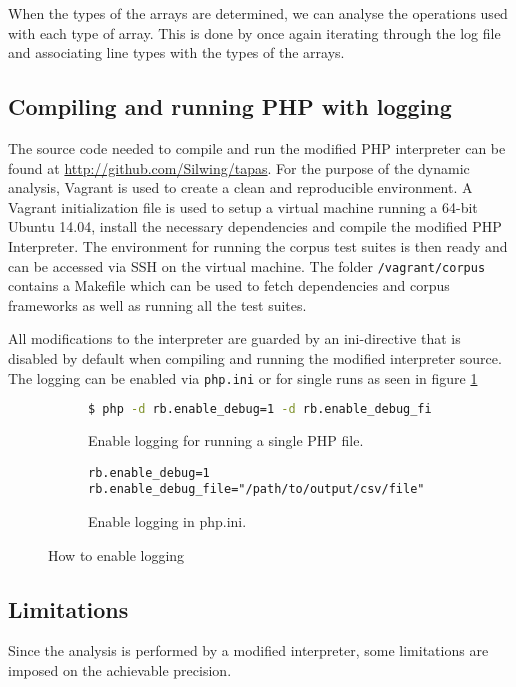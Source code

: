 When the types of the arrays are determined, we can analyse the operations used with each type of array. This is done by once again iterating through the log file and associating line types with the types of the arrays.

\subsection{Compiling and running PHP with logging}
The source code needed to compile and run the modified PHP interpreter can be found at \url{http://github.com/Silwing/tapas}. For the purpose of the dynamic analysis, Vagrant is used to create a clean and reproducible environment. A Vagrant initialization file is used to setup a virtual machine running a 64-bit Ubuntu 14.04, install the necessary dependencies and compile the modified PHP Interpreter. The environment for running the corpus test suites is then ready and can be accessed via SSH on the virtual machine. The folder \texttt{/vagrant/corpus} contains a Makefile which can be used to fetch dependencies and corpus frameworks as well as running all the test suites.

All modifications to the interpreter are guarded by an ini-directive that is disabled by default when compiling and running the modified interpreter source. The logging can be enabled via \texttt{php.ini} or for single runs as seen in figure \ref{fig:iniDirective}

\begin{figure}[ht]
\centering
\begin{subfigure}{\linewidth}
\begin{lstlisting}[language=bash]
$ php -d rb.enable_debug=1 -d rb.enable_debug_file=<path-to-log-file> <path-to-php-file>
\end{lstlisting}
\caption{Enable logging for running a single PHP file.}
\end{subfigure}
\begin{subfigure}{\linewidth}
\begin{lstlisting}
rb.enable_debug=1
rb.enable_debug_file="/path/to/output/csv/file"
\end{lstlisting}
\caption{Enable logging in php.ini.}
\end{subfigure}
\caption{How to enable logging}
\label{fig:iniDirective}
\end{figure}

\subsection{Limitations}
\label{sec:limitations}
Since the analysis is performed by a modified interpreter, some limitations are imposed on the achievable precision. 


